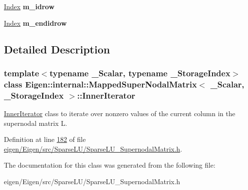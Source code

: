 \begin{DoxyCompactItemize}
\item 
\mbox{\label{class_eigen_1_1internal_1_1_mapped_super_nodal_matrix_1_1_inner_iterator_a9018de9372547fadad6f12edaf4d7aee}} 
\hyperlink{namespace_eigen_a62e77e0933482dafde8fe197d9a2cfde}{Index} {\bfseries m\+\_\+idrow}
\item 
\mbox{\label{class_eigen_1_1internal_1_1_mapped_super_nodal_matrix_1_1_inner_iterator_a38a6e67433d8b4e23e7dc38b4d66cc24}} 
\hyperlink{namespace_eigen_a62e77e0933482dafde8fe197d9a2cfde}{Index} {\bfseries m\+\_\+endidrow}
\end{DoxyCompactItemize}


\subsection{Detailed Description}
\subsubsection*{template$<$typename \+\_\+\+Scalar, typename \+\_\+\+Storage\+Index$>$\newline
class Eigen\+::internal\+::\+Mapped\+Super\+Nodal\+Matrix$<$ \+\_\+\+Scalar, \+\_\+\+Storage\+Index $>$\+::\+Inner\+Iterator}

\hyperlink{class_eigen_1_1internal_1_1_mapped_super_nodal_matrix_1_1_inner_iterator}{Inner\+Iterator} class to iterate over nonzero values of the current column in the supernodal matrix L. 

Definition at line \hyperlink{eigen_2_eigen_2src_2_sparse_l_u_2_sparse_l_u___supernodal_matrix_8h_source_l00182}{182} of file \hyperlink{eigen_2_eigen_2src_2_sparse_l_u_2_sparse_l_u___supernodal_matrix_8h_source}{eigen/\+Eigen/src/\+Sparse\+L\+U/\+Sparse\+L\+U\+\_\+\+Supernodal\+Matrix.\+h}.



The documentation for this class was generated from the following file\+:\begin{DoxyCompactItemize}
\item 
eigen/\+Eigen/src/\+Sparse\+L\+U/\+Sparse\+L\+U\+\_\+\+Supernodal\+Matrix.\+h\end{DoxyCompactItemize}
